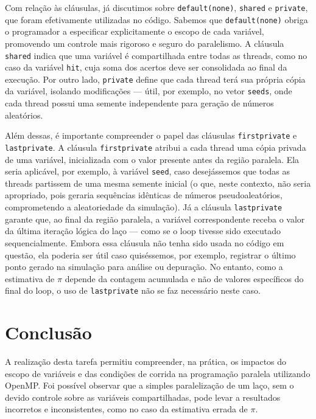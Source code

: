 \documentclass[a4paper, 12pt]{article}
\begin{document}
	Com relação às cláusulas, já discutimos sobre \texttt{default(none)}, \texttt{shared} e \texttt{private}, que foram efetivamente utilizadas no código. Sabemos que \texttt{default(none)} obriga o programador a especificar explicitamente o escopo de cada variável, promovendo um controle mais rigoroso e seguro do paralelismo. A cláusula \texttt{shared} indica que uma variável é compartilhada entre todas as threads, como no caso da variável \texttt{hit}, cuja soma dos acertos deve ser consolidada ao final da execução. Por outro lado, \texttt{private} define que cada thread terá sua própria cópia da variável, isolando modificações — útil, por exemplo, no vetor \texttt{seeds}, onde cada thread possui uma semente independente para geração de números aleatórios.
	
	Além dessas, é importante compreender o papel das cláusulas \texttt{firstprivate} e \texttt{lastprivate}. A cláusula \texttt{firstprivate} atribui a cada thread uma cópia privada de uma variável, inicializada com o valor presente antes da região paralela. Ela seria aplicável, por exemplo, à variável \texttt{seed}, caso desejássemos que todas as threads partissem de uma mesma semente inicial (o que, neste contexto, não seria apropriado, pois geraria sequências idênticas de números pseudoaleatórios, comprometendo a aleatoriedade da simulação). Já a cláusula \texttt{lastprivate} garante que, ao final da região paralela, a variável correspondente receba o valor da última iteração lógica do laço — como se o loop tivesse sido executado sequencialmente. Embora essa cláusula não tenha sido usada no código em questão, ela poderia ser útil caso quiséssemos, por exemplo, registrar o último ponto gerado na simulação para análise ou depuração. No entanto, como a estimativa de $\pi$ depende da contagem acumulada e não de valores específicos do final do loop, o uso de \texttt{lastprivate} não se faz necessário neste caso.
	
	\section{Conclusão}
	
	\hspace{0.5cm}A realização desta tarefa permitiu compreender, na prática, os impactos do escopo de variáveis e das condições de corrida na programação paralela utilizando OpenMP. Foi possível observar que a simples paralelização de um laço, sem o devido controle sobre as variáveis compartilhadas, pode levar a resultados incorretos e inconsistentes, como no caso da estimativa errada de $\pi$.
	
\end{document}
